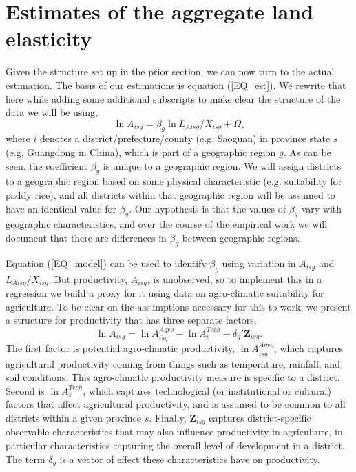 \documentclass[11pt]{article}
\begin{document}
\section{Estimates of the aggregate land elasticity}
Given the structure set up in the prior section, we can now turn to the actual estimation. The basis of our estimations is equation (\ref{EQ_est}). We rewrite that here while adding some additional subscripts to make clear the structure of the data we will be using,
\begin{equation}
\ln A_{isg} = \beta_g \ln L_{Aisg}/X_{isg} + \Omega_s \label{EQ_model}
\end{equation}
where $i$ denotes a district/prefecture/county (e.g. Saoguan) in province state $s$ (e.g. Guangdong in China), which is part of a geographic region $g$. As can be seen, the coefficient $\beta_g$ is unique to a geographic region. We will assign districts to a geographic region based on some physical characteristic (e.g. suitability for paddy rice), and all districts within that geographic region will be assumed to have an identical value for $\beta_g$. Our hypothesis is that the values of $\beta_g$ vary with geographic characteristics, and over the course of the empirical work we will document that there are differences in $\beta_g$ between geographic regions.

Equation (\ref{EQ_model}) can be used to identify $\beta_g$ using variation in $A_{isg}$ and $L_{Aisg}/X_{isg}$. But productivity, $A_{isg}$, is unobserved, so to implement this in a regression we build a proxy for it using data on agro-climatic suitability for agriculture. To be clear on the assumptions necessary for this to work, we present a structure for productivity that has three separate factors,
\begin{equation}
	\ln A_{isg} = \ln A_{isg}^{Agro} + \ln A_{s}^{Tech} + \delta_g' \mathbf{Z}_{isg}. \label{EQ_prod}
\end{equation}
The first factor is potential agro-climatic productivity, $\ln A_{isg}^{Agro}$, which captures agricultural productivity coming from things such as temperature, rainfall, and soil conditions. This agro-climatic productivity measure is specific to a district. Second is $\ln A_{s}^{Tech}$, which captures technological (or institutional or cultural) factors that affect agricultural productivity, and is assumed to be common to all districts within a given province $s$. Finally, $\mathbf{Z}_{isg}$ captures district-specific observable characteristics that may also influence productivity in agriculture, in particular characteristics capturing the overall level of development in a district. The term $\delta_g$ is a vector of effect these characteristics have on productivity.
\end{document}
